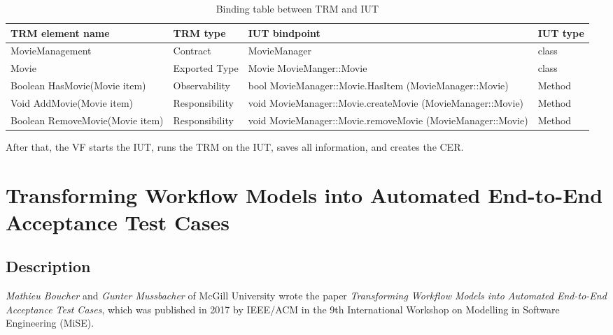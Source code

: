 \begin{table}[h] 
	\centering
	\begin{small}
		\caption{Binding table between TRM and IUT}
		\label{tab:bindingTable}
		\setlength{\tabcolsep}{1em}
		\begin{tabular}{>{\raggedright}p{3.5cm}| p{1.75cm}|>{\raggedright}p{5.8cm} |p{0.75cm} }
			\hline
			TRM element name & TRM type & IUT bindpoint & IUT type \\
			\hline
			\hline	
			MovieManagement & Contract & MovieManager & class\\
			\hline
			Movie & Exported Type & Movie MovieManger::Movie & class \\
			\hline
			Boolean HasMovie(Movie item) & Observability & bool MovieManager::Movie.HasItem (MovieManager::Movie) & Method \\
			\hline
			Void AddMovie(Movie item) & Responsibility & void  MovieManager::Movie.createMovie (MovieManager::Movie) & Method \\
			\hline
			Boolean RemoveMovie(Movie item) & Responsibility & void MovieManager::Movie.removeMovie (MovieManager::Movie) & Method \\
			\hline
		\end{tabular}
	\end{small}
\end{table}

After that, the VF starts the IUT, runs the TRM on the IUT, saves all information, and creates the CER.
\newpage
\section{Transforming Workflow Models into Automated End-to-End Acceptance Test Cases\cite{BoucherMussbacher2017}}
\label{topic08:sectionApproach2}

\subsection{Description}
\label{topic08:sectionApproach2Description}

\textit{Mathieu Boucher} and \textit{Gunter Mussbacher} of McGill University wrote the paper \textit{Transforming Workflow Models into Automated End-to-End Acceptance Test Cases}, which was published in 2017 by IEEE/ACM in the 9th International Workshop on Modelling in Software Engineering (MiSE).

